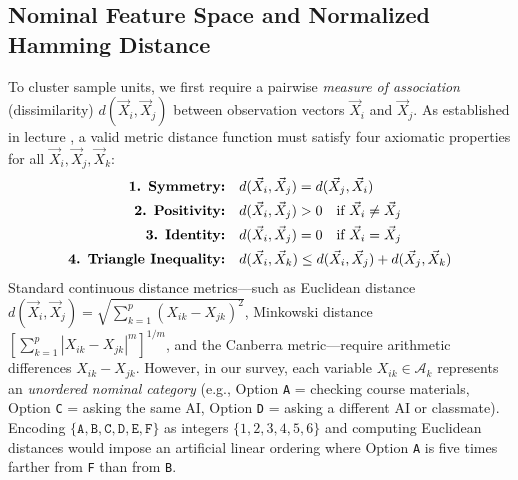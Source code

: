 \documentclass[11pt,a4paper]{article}
\begin{document}
\subsection{Nominal Feature Space and Normalized Hamming Distance}
To cluster sample units, we first require a pairwise \textit{measure of association} (dissimilarity) $d(\vec{X}_i, \vec{X}_j)$ between observation vectors $\vec{X}_i$ and $\vec{X}_j$. As established in lecture \cite{andersson2026}, a valid metric distance function must satisfy four axiomatic properties for all $\vec{X}_i, \vec{X}_j, \vec{X}_k$:
\begin{align}
    \text{\textbf{1. Symmetry:}} \quad & d(\vec{X}_i, \vec{X}_j) = d(\vec{X}_j, \vec{X}_i) \label{eq:sym}\\
    \text{\textbf{2. Positivity:}} \quad & d(\vec{X}_i, \vec{X}_j) > 0 \quad \text{if } \vec{X}_i \neq \vec{X}_j \label{eq:pos}\\
    \text{\textbf{3. Identity:}} \quad & d(\vec{X}_i, \vec{X}_j) = 0 \quad \text{if } \vec{X}_i = \vec{X}_j \label{eq:id}\\
    \text{\textbf{4. Triangle Inequality:}} \quad & d(\vec{X}_i, \vec{X}_k) \le d(\vec{X}_i, \vec{X}_j) + d(\vec{X}_j, \vec{X}_k) \label{eq:tri}
\end{align}
Standard continuous distance metrics---such as Euclidean distance $d(\vec{X}_i, \vec{X}_j) = \sqrt{\sum_{k=1}^p (X_{ik} - X_{jk})^2}$, Minkowski distance $\left[\sum_{k=1}^p |X_{ik} - X_{jk}|^m\right]^{1/m}$, and the Canberra metric---require arithmetic differences $X_{ik} - X_{jk}$. However, in our survey, each variable $X_{ik} \in \mathcal{A}_k$ represents an \textit{unordered nominal category} (e.g., Option \texttt{A} = checking course materials, Option \texttt{C} = asking the same AI, Option \texttt{D} = asking a different AI or classmate). Encoding $\{\texttt{A}, \texttt{B}, \texttt{C}, \texttt{D}, \texttt{E}, \texttt{F}\}$ as integers $\{1, 2, 3, 4, 5, 6\}$ and computing Euclidean distances would impose an artificial linear ordering where Option \texttt{A} is five times farther from \texttt{F} than from \texttt{B}.
\end{document}
